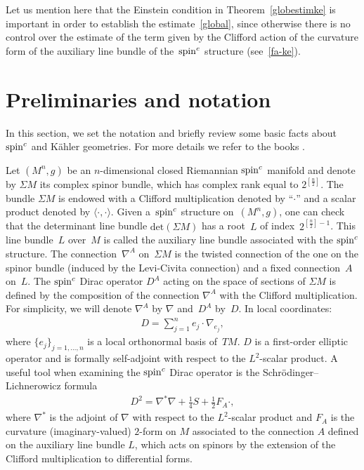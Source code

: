 \documentclass[pdftex]{sigma}
\numberwithin{equation}{section}
\theoremstyle{definition}
\begin{document}
Let us mention here that the Einstein condition in Theorem~\ref{globestimke} is important in order to establish the estimate~\eqref{global}, since otherwise there is no control over the estimate of the term given by the Clif\/ford action of the curvature form of the auxiliary line bundle of the~${\mathop{\rm spin}^c}$ structure (see~\eqref{fa-ke}).

\section{Preliminaries and notation}
In this section, we set the notation and brief\/ly review  some basic facts about ${\mathop{\rm spin}^c}$ and K\"ahler geometries.
For more details we refer to the books \cite{bookspin, fr_book,spin,am_lectures}.

Let $(M^{n}, g)$ be an $n$-dimensional closed Riemannian ${\mathop{\rm spin}^c}$  manifold and denote by $\Sigma M$ its complex spinor bundle,
which has complex rank equal to $2^{[\frac{n}{2}]}$. The bundle $\Sigma M$ is endowed with a Clif\/ford multiplication denoted by ``$\cdot$'' and a scalar product denoted by $\langle \cdot, \cdot\rangle$.
Given a~${\mathop{\rm spin}^c}$ structure on~$(M^{n}, g)$, one can check that the
determinant line bundle $\mathrm{det}(\Sigma M)$ has a root~$L$ of index~$2^{[\frac
{n}{2}]-1}$. This line bundle~$L$ over~$M$ is called the auxiliary line bundle associated with the
${\mathop{\rm spin}^c}$ structure.
The connection~$\nabla^A$ on~$\Sigma M$ is the twisted connection of the one on the spinor bundle (induced
by the Levi-Civita connection) and a f\/ixed connection~$A$ on~$L$.
The ${\mathop{\rm spin}^c}$ Dirac operator $D^A$ acting on the space of sections of $\Sigma M$
is def\/ined by the composition of the connection $\nabla^A$ with the Clif\/ford
multiplication. For simplicity, we will denote $\nabla^A$ by $\nabla$ and~$D^A$ by~$D$.
In local coordinates:
\begin{gather*}
D =\sum_{j=1}^{n} e_j \cdot \nabla_{e_j},
\end{gather*}
where $\{e_j\}_{j=1,\dots, n}$ is a local orthonormal basis of~$TM$.
$D$ is a f\/irst-order elliptic operator and is formally self-adjoint with respect to the $L^2$-scalar product.
A useful tool when examining the ${\mathop{\rm spin}^c}$ Dirac operator is the
Schr\"{o}dinger--Lichnerowicz formula
\begin{gather}
D^2 = \nabla^*\nabla + \frac 14 S +
\frac{1}{2}F_A \cdot,
\label{sl}
\end{gather}
where $\nabla^*$ is the adjoint of $\nabla$ with respect to the $L^2$-scalar
product  and $F_A$ is the curvature (imaginary-valued) $2$-form on $M$ associated to the connection $A$ def\/ined on the auxiliary line bundle $L$, which acts on spinors by the extension of the Clif\/ford multiplication to dif\/ferential forms.
\end{document}
